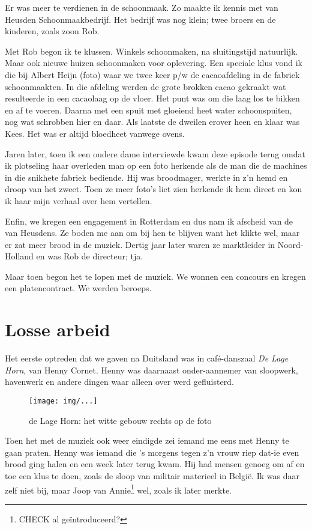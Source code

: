 \documentclass[10pt,twoside,openright]{memoir}
\begin{document}
Er was meer te verdienen in de schoonmaak. Zo maakte ik kennis met van Heusden Schoonmaakbedrijf. Het bedrijf was nog klein; twee broers en de kinderen, zoals zoon Rob. 

Met Rob begon ik te klussen. Winkels schoonmaken, na sluitingstijd natuurlijk. Maar ook nieuwe huizen schoonmaken voor oplevering. Een speciale klus vond ik die bij Albert Heijn (foto) waar we twee keer p/w de cacaoafdeling in de fabriek schoonmaakten. In die afdeling werden de grote brokken cacao gekraakt wat resulteerde in een cacaolaag op de vloer. Het punt was om die laag los te bikken en af te voeren. Daarna met een spuit met gloeiend heet water schoonspuiten, nog wat schrobben hier en daar. Als laatste de dweilen erover heen en klaar was Kees. Het was er altijd bloedheet vanwege ovens. 

Jaren later, toen ik een oudere dame interviewde kwam deze episode terug omdat ik plotseling haar overleden man op een foto herkende als de man die de machines in die snikhete fabriek bediende. Hij was broodmager, werkte in z’n hemd en droop van het zweet. Toen ze meer foto’s liet zien herkende ik hem direct en kon ik haar mijn verhaal over hem vertellen.

Enfin, we kregen een engagement in Rotterdam en dus nam ik afscheid van de van Heusdens. Ze boden me aan om bij hen te blijven want het klikte wel, maar er zat meer brood in de muziek. Dertig jaar later waren ze marktleider in Noord-Holland en was Rob de directeur; tja.

Maar toen begon het te lopen met de muziek. We wonnen een concours en kregen een platencontract. We werden beroeps. 


\chapter{Losse arbeid} %
\label{cha:lossearbeid}

Het eerste optreden dat we gaven na Duitsland was in café-danszaal \emph{De Lage Horn}, van Henny Cornet. Henny was daarnaast onder-aannemer van sloopwerk, havenwerk en andere dingen waar alleen over werd gefluisterd. 

\begin{figure}[t]
\texttt{[image: img/...]}
\caption{de Lage Horn: het witte gebouw rechts op de foto}
\end{figure}

Toen het met de muziek ook weer eindigde zei iemand me eens met Henny te gaan praten. Henny was iemand die ’s morgens tegen z’n vrouw riep dat-ie even brood ging halen en een week later terug kwam. Hij had mensen genoeg om af en toe een klus te doen, zoals de sloop van militair materieel in België. Ik was daar zelf niet bij, maar Joop van Annie\footnote{CHECK al geïntroduceerd?} wel, zoals ik later merkte. 
\end{document}
